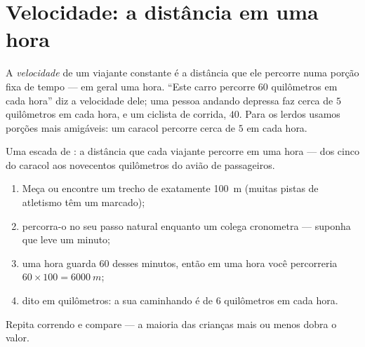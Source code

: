 \section{Velocidade: a distância em uma hora}

\begin{definition}[Velocidade]\label{def:g5:speed-distance-time:speed}
A \emph{velocidade} de um viajante constante é a
distância que ele percorre numa porção fixa de tempo --- em geral uma
hora. ``Este carro percorre $60$ quilômetros em cada hora'' diz a
velocidade dele; uma pessoa andando depressa faz cerca de $5$
quilômetros em cada hora, e um ciclista de corrida, $40$. Para os
lerdos usamos porções mais amigáveis: um caracol percorre cerca de
$5$  em cada hora.
\end{definition}

\begin{omfigure}

{\small Uma escada de : a distância que cada viajante
percorre em uma hora --- dos cinco  do caracol aos novecentos
quilômetros do avião de passageiros.}
\end{omfigure}

\begin{method}\label{met:g5:speed-distance-time:measure}
\begin{enumerate}
  \item Meça ou encontre um trecho de exatamente \qty{100}{m} (muitas
        pistas de atletismo têm um marcado);
  \item percorra-o no seu passo natural enquanto um colega cronometra
        --- suponha que leve um minuto;
  \item uma hora guarda $60$ desses minutos, então em uma hora você
        percorreria $60 \times 100 = \qty{6000}{m}$;
  \item dito em quilômetros: a sua  caminhando é de $6$
        quilômetros em cada hora.
\end{enumerate}
Repita correndo e compare --- a maioria das crianças mais ou menos
dobra o valor.
\end{method}

